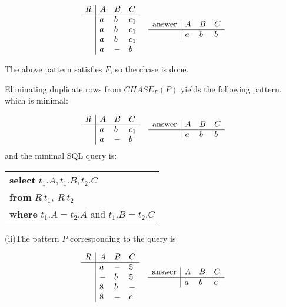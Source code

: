 \begin{enumerate}
\vspace{5mm}
$$
\begin{array}{ll}
\begin{array}{l|lll}
R & A & B & C \\ \hline
& a & b & c_1 \\
& a & b & c_1 \\
& a & b & c_1 \\
& a & - & b \\
\end{array} &
\begin{array}{l|lll}
\mbox{answer} & A & B & C \\ \hline
&  a & b & b \\
\end{array} 
\end{array}
$$

The above pattern satisfies $F$, so the chase is done.

\end{enumerate}


Eliminating duplicate rows from $CHASE_F(P)$ yields the following pattern, which is minimal:

$$
\begin{array}{ll}
\begin{array}{l|lll}
R & A & B & C \\ \hline
& a & b & c_1 \\
& a & - & b \\ 
\end{array} &
\begin{array}{l|lll}
\mbox{answer} & A & B & C \\ \hline
&  a & b & b \\
\end{array}
\end{array}
$$
and the minimal SQL query is:

\vspace{5mm}
\begin{tabular}{l}
{\bf select} $t_1.A, t_1.B, t_2.C$ \\
{\bf from} $R~t_1, ~R~t_2$ \\
{\bf where} $t_1.A = t_2.A$ and $t_1.B = t_2.C$ 
\end{tabular}




\vspace{4mm}
\noindent
(ii)The pattern $P$ corresponding to the query is

\vspace{1cm}
$$
\begin{array}{ll}
\begin{array}{l|lll}
R & A & B & C \\ \hline
& a & - & 5 \\
& - & b & 5 \\
& 8 & b & - \\
& 8 & - & c 
\end{array} &
\begin{array}{l|lll}
\mbox{answer} & A & B & C \\ \hline
&  a & b & c \\
\end{array}
\end{array}
$$


